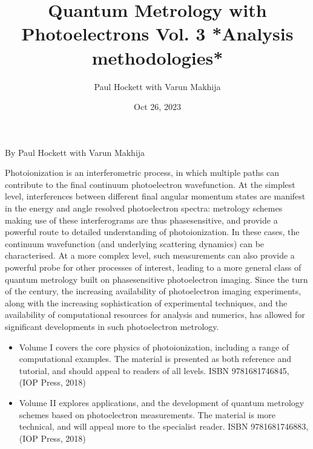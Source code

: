 \documentclass[letterpaper,table,10pt,english]{jupyterBook}
\title{Quantum Metrology with Photoelectrons Vol. 3 *Analysis methodologies*}
\date{Oct 26, 2023}
\author{Paul Hockett with Varun Makhija}
\begin{document}
\pagestyle{empty}
\sphinxmaketitle
\pagestyle{plain}
\sphinxtableofcontents
\pagestyle{normal}
\label{\detokenize{intro::doc}}


\begin{DUlineblock}{0em}
\item[] 
\end{DUlineblock}

\sphinxAtStartPar
By Paul Hockett with Varun Makhija

\begin{DUlineblock}{0em}
\item[] 
\end{DUlineblock}

\sphinxAtStartPar
Photoionization is an interferometric process, in which multiple paths can contribute to the final continuum photoelectron wavefunction. At the simplest level, interferences between different final angular momentum states are manifest in the energy and angle resolved photoelectron spectra: metrology schemes making use of these interferograms are thus phase\sphinxhyphen{}sensitive, and provide a powerful route to detailed understanding of photoionization. In these cases, the continuum wavefunction (and underlying scattering dynamics) can be characterised. At a more complex level, such measurements can also provide a powerful probe for other processes of interest, leading to a more general class of quantum metrology built on phase\sphinxhyphen{}sensitive photoelectron imaging.  Since the turn of the century, the increasing availability of photoelectron imaging experiments, along with the increasing sophistication of experimental techniques, and the availability of computational resources for analysis and numerics, has allowed for significant developments in such photoelectron metrology.

\begin{itemize}
\item {} 
\sphinxAtStartPar
Volume I covers the core physics of photoionization, including a range of computational examples. The material is presented as both reference and tutorial, and should appeal to readers of all levels. ISBN 978\sphinxhyphen{}1\sphinxhyphen{}6817\sphinxhyphen{}4684\sphinxhyphen{}5,  (IOP Press, 2018)

\item {} 
\sphinxAtStartPar
Volume II explores applications, and the development of quantum metrology schemes based on photoelectron measurements. The material is more technical, and will appeal more to the specialist reader. ISBN 978\sphinxhyphen{}1\sphinxhyphen{}6817\sphinxhyphen{}4688\sphinxhyphen{}3,  (IOP Press, 2018)

\end{itemize}
\end{document}
